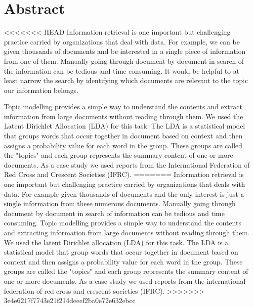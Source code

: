 
\chapter*{Abstract} 
<<<<<<< HEAD
Information retrieval is one  important but challenging practice carried by organizations that deal with data. For example, we can be given thousands of documents and be interested in a single piece of information from one of them. Manually going through document by document  in search of the information can be tedious and time consuming. It would be helpful to at least narrow the search by identifying which documents are relevant to the topic our information belongs.


Topic modelling  provides a simple way to understand the contents and extract information from  large documents without  reading through them. We used the Latent Dirichlet Allocation (LDA) for this task. The LDA  is a statistical model that groups words that occur together in document based on context and then assigns a probability value for each word in the group. These groups are called the "topics" and each group represents the summary content of one or more documents. 
As a case study we used reports from the International Federation of Red Cross and Crescent Societies (IFRC). 
=======
Information retrieval is one  important but challenging practice carried by organizations that deals with data.
For example given thousands of documents and the only interest is just a single information from these numerous documents.
Manually going through document by document  in search of information can be tedious and time consuming.
Topic modelling  provides a simple way to understand the contents and extracting
information from  large documents without  reading through them.
We used the latent Dirichlet allocation (LDA) for this task.
The LDA  is a statistical model that group
words that occur together in document based on context and then assigns a probability value for each word in the group. These groups are called the "topics" and each group represents the summary content of one or more documents. 
As a case study we used reports from the
international federation of red cross and crescent societies (IFRC).
>>>>>>> 3e4e6217f7743e21f214deeef2ba0e72e632ebcc


